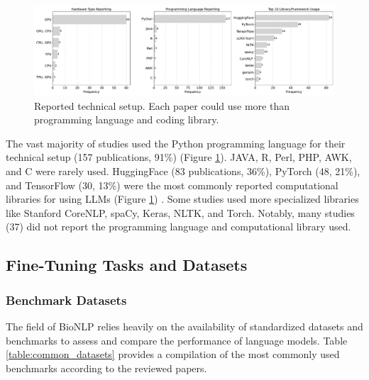 \documentclass[fleqn,10pt]{olplainarticle}
\begin{document}
\begin{figure}[h]
\begin{center}
\includegraphics[scale=0.30]{visuals/new_pdf/technical_summary_2024.pdf} %
\caption{Reported technical setup. Each paper could use more than programming language and coding library.}
\label{fig:technical_summary_2024}
\end{center}
\end{figure}

The vast majority of studies used the Python programming language for their technical setup (157 publications, 91\%) (Figure \ref{fig:technical_summary_2024}). JAVA, R, Perl, PHP, AWK, and C were rarely used. HuggingFace (83 publications, 36\%), PyTorch (48, 21\%), and TensorFlow (30, 13\%) were the most commonly reported computational libraries for using LLMs (Figure \ref{fig:technical_summary_2024}) . Some studies used more specialized libraries like Stanford CoreNLP, spaCy, Keras, NLTK, and Torch. Notably, many studies (37) did not report the programming language and computational library used.


\subsection*{Fine-Tuning Tasks and Datasets}
\subsubsection*{Benchmark Datasets}
The field of BioNLP relies heavily on the availability of standardized datasets and benchmarks to assess and compare the performance of language models. Table \ref{table:common_datasets} provides a compilation of the most commonly used benchmarks according to the reviewed papers.
\end{document}
